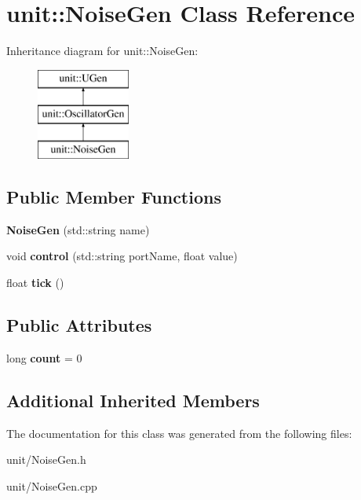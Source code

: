 \hypertarget{classunit_1_1NoiseGen}{}\section{unit\+:\+:Noise\+Gen Class Reference}
\label{classunit_1_1NoiseGen}
Inheritance diagram for unit\+:\+:Noise\+Gen\+:\begin{figure}[H]
\begin{center}
\leavevmode
\includegraphics[height=3.000000cm]{classunit_1_1NoiseGen}
\end{center}
\end{figure}
\subsection*{Public Member Functions}
\begin{DoxyCompactItemize}
\item 
{\bfseries Noise\+Gen} (std\+::string name)\hypertarget{classunit_1_1NoiseGen_aa49d8817fff2757abc19f0dffea0c7fe}{}\label{classunit_1_1NoiseGen_aa49d8817fff2757abc19f0dffea0c7fe}

\item 
void {\bfseries control} (std\+::string port\+Name, float value)\hypertarget{classunit_1_1NoiseGen_a73628ae13d893658b88bc30eb43437ba}{}\label{classunit_1_1NoiseGen_a73628ae13d893658b88bc30eb43437ba}

\item 
float {\bfseries tick} ()\hypertarget{classunit_1_1NoiseGen_addaecf96df1cf9f1ba4875fb849949df}{}\label{classunit_1_1NoiseGen_addaecf96df1cf9f1ba4875fb849949df}

\end{DoxyCompactItemize}
\subsection*{Public Attributes}
\begin{DoxyCompactItemize}
\item 
long {\bfseries count} = 0\hypertarget{classunit_1_1NoiseGen_a9509da6dba8e294d3e5bc26d2eb6d39f}{}\label{classunit_1_1NoiseGen_a9509da6dba8e294d3e5bc26d2eb6d39f}

\end{DoxyCompactItemize}
\subsection*{Additional Inherited Members}


The documentation for this class was generated from the following files\+:\begin{DoxyCompactItemize}
\item 
unit/Noise\+Gen.\+h\item 
unit/Noise\+Gen.\+cpp\end{DoxyCompactItemize}
